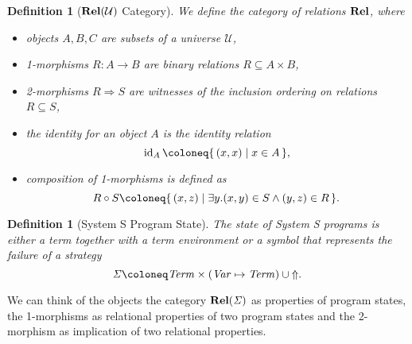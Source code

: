\documentclass{article}
\newtheorem{definition}[theorem]{Definition}
\newcommand{\Term}{\ensuremath \mathit{Term}}
\newcommand{\Fail}{\ensuremath \text{$\Uparrow$}}
\newcommand{\Var}{\ensuremath \mathit{Var}}
\newcommand{\Env}{\ensuremath \Var \mapsto \Term}
\newcommand{\Cat}[1]{\ensuremath \mathbf{#1}}
\newcommand{\State}{\ensuremath \mathit{\Sigma} }
\newcommand{\setbuild}[2]{\ensuremath \{\, #1 \mid #2 \,\}}
\newcommand{\id}{\ensuremath \operatorname{id}}
\newcommand{\Rel}{\ensuremath \Cat{Rel}}
\begin{document}
\begin{definition}[$\Rel(\mathcal{U})$ Category] \normalfont
  We define the category of relations $\Rel$, where 
  \begin{itemize}
  \item objects $A,B,C$ are subsets of a universe $\mathcal{U}$,
  \item 1-morphisms $R: A \rightarrow B$ are binary relations $R \subseteq A \times B$,
  \item 2-morphisms $R \Rightarrow S$ are witnesses of the inclusion ordering on relations $R \subseteq S$,
  \item the identity for an object $A$ is the identity relation \[\id_A \coloneq \setbuild{ (x,x) }{ x \in A },\]
  \item composition of 1-morphisms is defined as \[R \circ S \coloneq \setbuild{(x,z)}{ \exists y. (x,y) \in S \land (y,z) \in R }.\]
  \end{itemize}
\end{definition}

\begin{definition}[System S Program State] \normalfont
  The state of System S programs is either a term together with a term environment or a symbol that represents the failure of a strategy \[\State \coloneq \Term \times (\Env) \cup \Fail.\]
\end{definition}

We can think of the objects the category $\Rel(\State)$ as properties of program states, the 1-morphisms as relational properties of two program states and the 2-morphism as implication of two relational properties.
\end{document}
